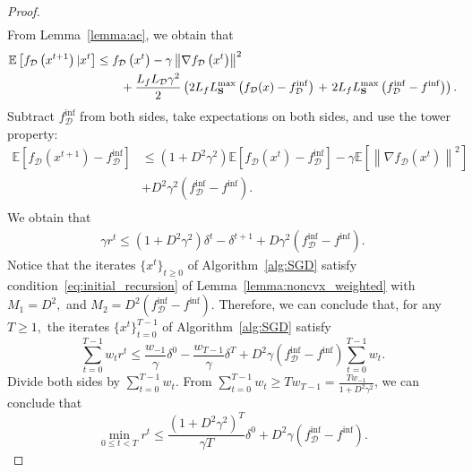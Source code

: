 \documentclass{article}
\newcommand{\bb}{\mathbb}
\newcommand{\Exp}[1]{{\bb E}\left[#1\right]}
\theoremstyle{plain}
\newcommand{\tf}{f_{\mathcal{D}}}
\newcommand{\mS}{{\bf S}}
\theoremstyle{plain}
\theoremstyle{definition}
\theoremstyle{remark}
\begin{document}
\begin{proof}
\begin{equation*}
\begin{split}
		\end{split}
	\end{equation*}
	From Lemma~\ref{lemma:ac}, we obtain that
	\begin{equation*}
		\begin{split}
			\Exp{\tf\left(x^{t+1}\right)|x^t} & \leq \tf\left(x^{t}\right) - \gamma \left\|\nabla \tf\left(x^t\right)\right\|^2 \\
            & \qquad + \frac{L_fL_{\mathcal{D}}\gamma^2}{2} \left(2L_fL_{\mS}^{\max} \left(\tf(x) - \tf^{\inf}\right)\right.
            + \left. 2L_fL_{\mS}^{\max} \left(\tf^{\inf} - f^{\inf}\right)\right).
		\end{split}
	\end{equation*}
	Subtract $\tf^{\inf}$ from both sides, take expectations on both sides, and use the tower property:
	\begin{equation*}
		\begin{split}
			\Exp{\tf\left(x^{t+1}\right) - \tf^{\inf}} & \leq \left(1+D^2\gamma^2\right)\Exp{\tf\left(x^{t}\right) - \tf^{\inf}} - \gamma \Exp{\left\|\nabla \tf\left(x^t\right)\right\|^2}\\
			&+ D^2\gamma^2\left(\tf^{\inf} - f^{\inf}\right).\\
		\end{split}
	\end{equation*}
	We obtain that
	\begin{equation*}
		\begin{split}
			\gamma r^t\leq \left(1+D^2\gamma^2\right)\delta^t- \delta^{t+1} + D\gamma^2\left(\tf^{\inf} - f^{\inf}\right).
		\end{split}
	\end{equation*}
	Notice that the iterates $\{x^t\}_{t\geq 0}$ of Algorithm~\ref{alg:SGD} satisfy condition~\eqref{eq:initial_recursion} of Lemma~\ref{lemma:noncvx_weighted} with $M_1=D^2,$
	and
	$M_2=D^2\left(\tf^{\inf} - f^{\inf}\right).$ Therefore, we can conclude that, for any $T\geq 1,$ the iterates $\{x^t\}_{t=0}^{T-1}$ of Algorithm~\ref{alg:SGD} satisfy
	\begin{equation*}
		\sum_{t=0}^{T-1}w_tr^t\leq \frac{w_{-1}}{\gamma}\delta^0 - \frac{w_{T-1}}{\gamma}\delta^{T} + D^2\gamma \left(\tf^{\inf} - f^{\inf}\right)\sum_{t=0}^{T-1}w_t.
	\end{equation*}
	Divide both sides by $\sum_{t=0}^{T-1}w_t.$ From $\sum_{t=0}^{T-1}w_t\geq Tw_{T-1} = \frac{Tw_{-1}}{1+D^2\gamma^2}$, we can conclude that
	\begin{equation*}
		\min_{0 \leq t < T}r^t\leq \frac{\left(1+D^2\gamma^2\right)^T}{\gamma T}\delta^0 + D^2\gamma \left(\tf^{\inf} - f^{\inf}\right).
	\end{equation*}
\end{proof}
\end{document}
